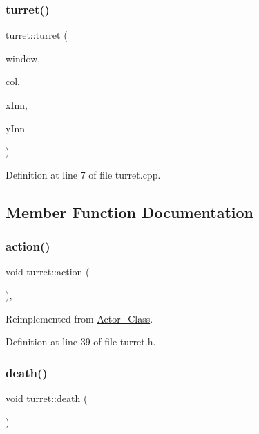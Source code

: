 \subsubsection{\texorpdfstring{turret()}{turret()}}
{\footnotesize\ttfamily turret\+::turret (\begin{DoxyParamCaption}\item[{sf\+::\+Render\+Window \&}]{window,  }\item[{\hyperlink{class_collision}{Collision}}]{col,  }\item[{int}]{x\+Inn,  }\item[{int}]{y\+Inn }\end{DoxyParamCaption})}



Definition at line 7 of file turret.\+cpp.



\subsection{Member Function Documentation}
\hypertarget{classturret_a883048366044ccc7abd00a7f57400d2a}{}\label{classturret_a883048366044ccc7abd00a7f57400d2a} 
\subsubsection{\texorpdfstring{action()}{action()}}
{\footnotesize\ttfamily void turret\+::action (\begin{DoxyParamCaption}{ }\end{DoxyParamCaption})\hspace{0.3cm}{\ttfamily [inline]}, {\ttfamily [virtual]}}



Reimplemented from \hyperlink{class_actor___class_ab8e23ffae108da3b8eda67c6753bdae0}{Actor\+\_\+\+Class}.



Definition at line 39 of file turret.\+h.

\hypertarget{classturret_a51ac1a996e5139a03f331c382d136a95}{}\label{classturret_a51ac1a996e5139a03f331c382d136a95} 
\subsubsection{\texorpdfstring{death()}{death()}}
{\footnotesize\ttfamily void turret\+::death (\begin{DoxyParamCaption}{ }\end{DoxyParamCaption})\hspace{0.3cm}{\ttfamily [virtual]}}



